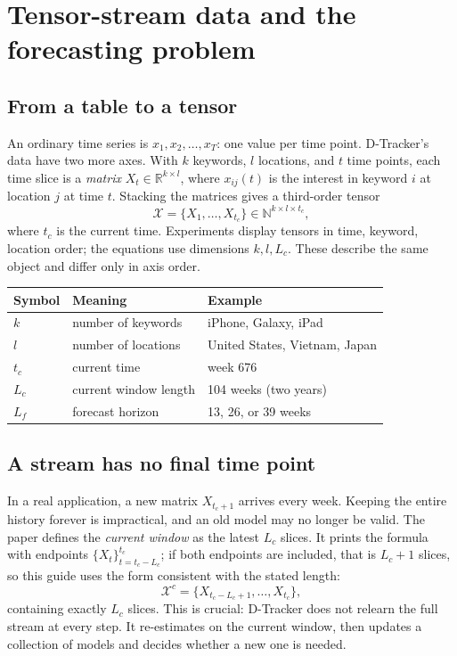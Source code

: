 \section{Tensor-stream data and the forecasting problem}
\label{sec:problem}

\subsection{From a table to a tensor}

An ordinary time series is $x_1,x_2,\ldots,x_T$: one value per time point. D-Tracker's data have
two more axes. With $k$ keywords, $l$ locations, and $t$ time points, each time slice is a
\emph{matrix} $X_t\in\mathbb{R}^{k\times l}$, where $x_{ij}(t)$ is the interest in keyword $i$ at
location $j$ at time $t$. Stacking the matrices gives a third-order tensor
\begin{equation}
  \mathcal{X}=\{X_1,\ldots,X_{t_c}\}\in\mathbb{N}^{k\times l\times t_c},
  \label{eq:stream}
\end{equation}
where $t_c$ is the current time. Experiments display tensors in time, keyword, location order; the
equations use dimensions $k,l,L_c$. These describe the same object and differ only in axis order.

\begin{center}
\small
\begin{tabular}{@{}lll@{}}
  \toprule
  Symbol & Meaning & Example \\
  \midrule
  $k$ & number of keywords & iPhone, Galaxy, iPad \\
  $l$ & number of locations & United States, Vietnam, Japan \\
  $t_c$ & current time & week 676 \\
  $L_c$ & current window length & 104 weeks (two years) \\
  $L_f$ & forecast horizon & 13, 26, or 39 weeks \\
  \bottomrule
\end{tabular}
\end{center}

\subsection{A stream has no final time point}

In a real application, a new matrix $X_{t_c+1}$ arrives every week. Keeping the entire history
forever is impractical, and an old model may no longer be valid. The paper defines the
\emph{current window} as the latest $L_c$ slices. It prints the formula with endpoints
$\{X_t\}_{t=t_c-L_c}^{t_c}$; if both endpoints are included, that is $L_c+1$ slices, so this guide
uses the form consistent with the stated length:
\begin{equation}
  \mathcal{X}^{c}=\{X_{t_c-L_c+1},\ldots,X_{t_c}\},
  \label{eq:window}
\end{equation}
containing exactly $L_c$ slices. This is crucial: D-Tracker does not relearn the full stream
at every step. It re-estimates on the current window, then updates a collection of models and
decides whether a new one is needed.


